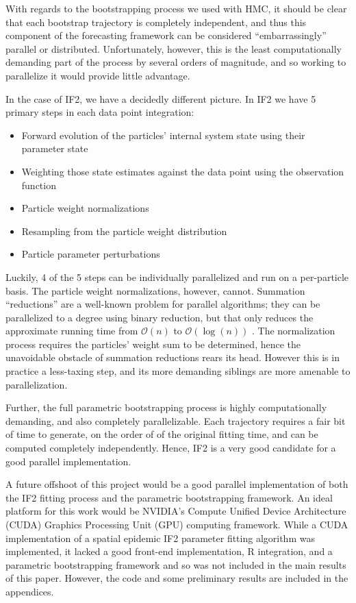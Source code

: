 	With regards to the bootstrapping process we used with HMC, it should be clear that each bootstrap trajectory is completely independent, and thus this component of the forecasting framework can be considered ``embarrassingly'' parallel or distributed. Unfortunately, however, this is the least computationally demanding part of the process by several orders of magnitude, and so working to parallelize it would provide little advantage.

	In the case of IF2, we have a decidedly different picture. In IF2 we have 5 primary steps in each data point integration: 

	\begin{itemize}
		\item Forward evolution of the particles' internal system state using their parameter state
		\item Weighting those state estimates against the data point using the observation function
		\item Particle weight normalizations
		\item Resampling from the particle weight distribution
		\item Particle parameter perturbations
	\end{itemize}

	Luckily, 4 of the 5 steps can be individually parallelized and run on a per-particle basis. The particle weight normalizations, however, cannot. Summation ``reductions'' are a well-known problem for parallel algorithms; they can be parallelized to a degree using binary reduction, but that only reduces the approximate running time from $\mathcal{O}(n)$ to $\mathcal{O}(\log(n))$ \cite{harris2007}. The normalization process requires the particles' weight sum to be determined, hence the unavoidable obstacle of summation reductions rears its head. However this is in practice a less-taxing step, and its more demanding siblings are more amenable to parallelization.

	Further, the full parametric bootstrapping process is highly computationally demanding, and also completely parallelizable. Each trajectory requires a fair bit of time to generate, on the order of of the original fitting time, and can be computed completely independently. Hence, IF2 is a very good candidate for a good parallel implementation.

	A future offshoot of this project would be a good parallel implementation of both the IF2 fitting process and the parametric bootstrapping framework. An ideal platform for this work would be NVIDIA's Compute Unified Device Architecture (CUDA) Graphics Processing Unit (GPU) computing framework. While a CUDA implementation of a spatial epidemic IF2 parameter fitting algorithm was implemented, it lacked a good front-end implementation, R integration, and a parametric bootstrapping framework and so was not included in the main results of this paper. However, the code and some preliminary results are included in the appendices.

